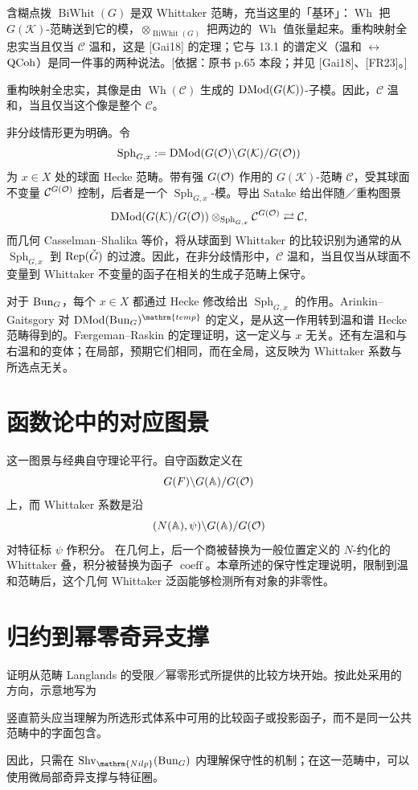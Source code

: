 \begin{transnote}{含糊点拨}
$\operatorname{BiWhit}(G)$ 是双 Whittaker 范畴，充当这里的「基环」：$\operatorname{Wh}$ 把 $G(\mathcal K)$-范畴送到它的模，$\otimes_{\operatorname{BiWhit}(G)}$ 把两边的 $\operatorname{Wh}$ 值张量起来。重构映射全忠实当且仅当 $\mathcal{C}$ 温和，这是 [Gai18] 的定理；它与 13.1 的谱定义（温和 $\leftrightarrow$ $\operatorname{QCoh}$）是同一件事的两种说法。[依据：原书 p.65 本段；并见 [Gai18]、[FR23]。]
\end{transnote}
重构映射全忠实，其像是由 $\operatorname{Wh}(\mathcal C)$ 生成的 $\operatorname{DMod}(G(\mathcal K))$-子模。因此，$\mathcal C$ 温和，当且仅当这个像是整个 $\mathcal C$。

非分歧情形更为明确。令
\[\operatorname{Sph}_{G,x}:=\operatorname{DMod}(G(\mathcal{O})\backslash G(\mathcal K)/G(\mathcal{O}))\]
为 $x\in X$ 处的球面 Hecke 范畴。带有强 $G(\mathcal{O})$ 作用的 $G(\mathcal K)$-范畴 $\mathcal C$，受其球面不变量 $\mathcal C^{G(\mathcal{O})}$ 控制，后者是一个 $\operatorname{Sph}_{G,x}$-模。导出 Satake 给出伴随／重构图景
\[\operatorname{DMod}(G(\mathcal K)/G(\mathcal{O}))\otimes_{\operatorname{Sph}_{G,x}}\mathcal C^{G(\mathcal{O})}\rightleftarrows\mathcal C,\]
而几何 Casselman–Shalika 等价，将从球面到 Whittaker 的比较识别为通常的从 $\operatorname{Sph}_{G,x}$ 到 $\operatorname{Rep}(\check{G})$ 的过渡。因此，在非分歧情形中，$\mathcal C$ 温和，当且仅当从球面不变量到 Whittaker 不变量的函子在相关的生成子范畴上保守。

对于 $\operatorname{Bun}_G$，每个 $x\in X$ 都通过 Hecke 修改给出 $\operatorname{Sph}_{G,x}$ 的作用。Arinkin–Gaitsgory 对 $\DMod(\Bun_G)^{\mathrm{temp}}$ 的定义，是从这一作用转到温和谱 Hecke 范畴得到的。Færgeman–Raskin 的定理证明，这一定义与 $x$ 无关\cite{FR23}。还有左温和与右温和的变体；在局部，预期它们相同，而在全局，这反映为 Whittaker 系数与所选点无关。

\section{函数论中的对应图景}\label{sec:13.3}
这一图景与经典自守理论平行。自守函数定义在
\[G(F)\backslash G(\mathbb{A})/G(\mathcal{O})\]
上，而 Whittaker 系数是沿
\[(N(\mathbb{A}),\psi)\backslash G(\mathbb{A})/G(\mathcal{O})\]
对特征标 $\psi$ 作积分。
在几何上，后一个商被替换为一般位置定义的 $N$-约化的 Whittaker 叠，积分被替换为函子 $\operatorname{coeff}$。本章所述的保守性定理说明，限制到温和范畴后，这个几何 Whittaker 泛函能够检测所有对象的非零性。

\section{归约到幂零奇异支撑}\label{sec:13.4}
证明从范畴 Langlands 的受限／幂零形式所提供的比较方块开始。按此处采用的方向，示意地写为
\begin{note}
竖直箭头应当理解为所选形式体系中可用的比较函子或投影函子，而不是同一公共范畴中的字面包含。
\end{note}
因此，只需在 $\Shv_{\mathrm{Nilp}}(\Bun_G)$ 内理解保守性的机制；在这一范畴中，可以使用微局部奇异支撑与特征圈。

